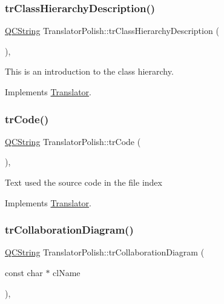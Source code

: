 \subsubsection{\texorpdfstring{trClassHierarchyDescription()}{trClassHierarchyDescription()}}
{\footnotesize\ttfamily \mbox{\hyperlink{class_q_c_string}{Q\+C\+String}} Translator\+Polish\+::tr\+Class\+Hierarchy\+Description (\begin{DoxyParamCaption}{ }\end{DoxyParamCaption})\hspace{0.3cm}{\ttfamily [inline]}, {\ttfamily [virtual]}}

This is an introduction to the class hierarchy. 

Implements \mbox{\hyperlink{class_translator}{Translator}}.

\mbox{\label{class_translator_polish_ae72a70da9005a4d328c5e11a1c6f0057}} 
\subsubsection{\texorpdfstring{trCode()}{trCode()}}
{\footnotesize\ttfamily \mbox{\hyperlink{class_q_c_string}{Q\+C\+String}} Translator\+Polish\+::tr\+Code (\begin{DoxyParamCaption}{ }\end{DoxyParamCaption})\hspace{0.3cm}{\ttfamily [inline]}, {\ttfamily [virtual]}}

Text used the source code in the file index 

Implements \mbox{\hyperlink{class_translator}{Translator}}.

\mbox{\label{class_translator_polish_a82e1c3150ac33284de27b9864f9810d1}} 
\subsubsection{\texorpdfstring{trCollaborationDiagram()}{trCollaborationDiagram()}}
{\footnotesize\ttfamily \mbox{\hyperlink{class_q_c_string}{Q\+C\+String}} Translator\+Polish\+::tr\+Collaboration\+Diagram (\begin{DoxyParamCaption}\item[{const char $\ast$}]{cl\+Name }\end{DoxyParamCaption})\hspace{0.3cm}{\ttfamily [inline]}, {\ttfamily [virtual]}}

